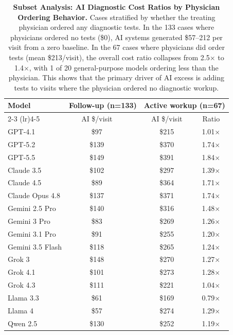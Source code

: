 \begin{table}[p]
\centering
\small
\caption{\textbf{Subset Analysis: AI Diagnostic Cost Ratios by Physician Ordering Behavior.} Cases stratified by whether the treating physician ordered any diagnostic tests. In the 133 cases where physicians ordered no tests (\$0), AI systems generated \$57--212 per visit from a zero baseline. In the 67 cases where physicians did order tests (mean \$213/visit), the overall cost ratio collapses from 2.5$\times$ to 1.4$\times$, with 1 of 20 general-purpose models ordering less than the physician. This shows that the primary driver of AI excess is adding tests to visits where the physician ordered no diagnostic workup.}
\label{tab:phys_ordering}
\begin{tabular}{l c c c c}
\toprule
\textbf{Model} & \multicolumn{2}{c}{\textbf{Follow-up (n=133)}} & \multicolumn{2}{c}{\textbf{Active workup (n=67)}} \\
\cmidrule(lr){2-3} \cmidrule(lr){4-5}
 & AI \$/visit & & AI \$/visit & Ratio \\
\midrule
GPT-4.1 & \$97 & & \$215 & 1.01$\times$ \\
\rowcolor{gray!8} GPT-5.2 & \$139 & & \$370 & 1.74$\times$ \\
GPT-5.5 & \$149 & & \$391 & 1.84$\times$ \\
\rowcolor{gray!8} Claude 3.5 & \$102 & & \$297 & 1.39$\times$ \\
Claude 4.5 & \$89 & & \$364 & 1.71$\times$ \\
\rowcolor{gray!8} Claude Opus 4.8 & \$137 & & \$371 & 1.74$\times$ \\
Gemini 2.5 Pro & \$140 & & \$316 & 1.48$\times$ \\
\rowcolor{gray!8} Gemini 3 Pro & \$83 & & \$269 & 1.26$\times$ \\
Gemini 3.1 Pro & \$91 & & \$255 & 1.20$\times$ \\
\rowcolor{gray!8} Gemini 3.5 Flash & \$118 & & \$265 & 1.24$\times$ \\
Grok 3 & \$148 & & \$270 & 1.27$\times$ \\
\rowcolor{gray!8} Grok 4.1 & \$101 & & \$273 & 1.28$\times$ \\
Grok 4.3 & \$111 & & \$221 & 1.04$\times$ \\
\rowcolor{gray!8} Llama 3.3 & \$61 & & \$169 & 0.79$\times$ \\
Llama 4 & \$57 & & \$274 & 1.29$\times$ \\
\rowcolor{gray!8} Qwen 2.5 & \$130 & & \$252 & 1.19$\times$ \\

\end{tabular}
\end{table}
